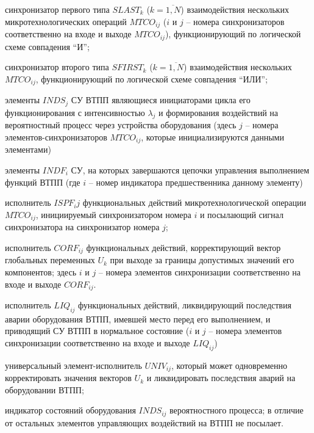 \begin{textitemize}
    \item синхронизатор первого типа $SLAST_k$ ($k= \overline{1,N} $) взаимодействия нескольких микротехнологических операций $MTCO_{ij}$ ($i$ и $j$ – номера синхронизаторов соответственно на входе и выходе $MTCO_{ij}$), функционирующий по логической схеме совпадения ``И'';
    \item синхронизатор второго типа $SFIRST_k$ ($k= \overline{1,N} $) взаимодействия нескольких $MTCO_{ij}$, функционирующий по логической схеме совпадения ``ИЛИ'';
    \item элементы $INDS_j$ СУ ВТПП являющиеся инициаторами цикла его функционирования с интенсивностью $\lambda_j$ и формирования воздействий на вероятностный процесс через устройства оборудования (здесь $j$ – номера элементов-синхронизаторов $MTCO_{ij}$, которые инициализируются данными элементами)
    \item элементы $INDF_i$ СУ, на которых завершаются цепочки управления выполнением функций ВТПП (где $i$ – номер индикатора предшественника данному элементу)
    \item исполнитель $ISPF_ij$ функциональных действий микротехнологической операции  $MTCO_{ij}$, инициируемый синхронизатором номера $i$ и посылающий сигнал синхронизатора на синхронизатор номера $j$;
    \item исполнитель $CORF_{ij}$ функциональных действий, корректирующий вектор глобальных переменных $U_k$ при выходе за границы допустимых значений его компонентов; здесь $i$ и $j$ – номера элементов синхронизации соответственно на входе и выходе $CORF_{ij}$.
    \item исполнитель $LIQ_{ij}$ функциональных действий, ликвидирующий последствия аварии оборудования ВТПП, имевшей место перед его выполнением, и приводящий СУ ВТПП в нормальное состояние ($i$ и $j$ – номера элементов синхронизации соответственно на входе и выходе $LIQ_{ij}$)
    \item универсальный элемент-исполнитель $UNIV_{ij}$, который может одновременно корректировать значения векторов $U_k$ и ликвидировать последствия аварий на оборудовании ВТПП;
    \item индикатор состояний оборудования $INDS_{ij}$ вероятностного процесса; в отличие от остальных элементов управляющих воздействий на ВТПП не посылает.
\end{textitemize}


